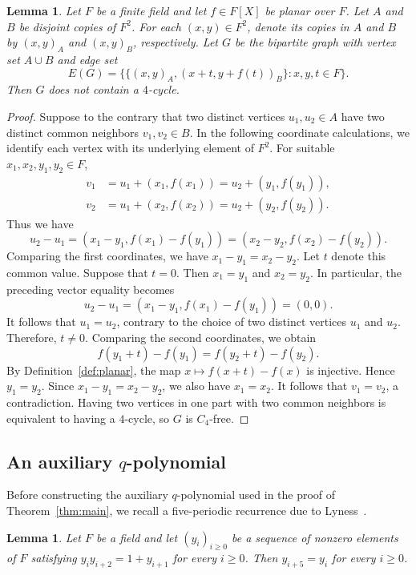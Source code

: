 \documentclass[12pt]{article}
\numberwithin{equation}{section}
\newtheorem{lemma}[theorem]{Lemma}
\theoremstyle{definition}
\begin{document}
\begin{lemma}\label{lem:planar-graph}
Let $F$ be a finite field and let $f\in F[X]$ be planar over $F$. Let $A$ and $B$ be disjoint copies of $F^2$. For each $(x,y)\in F^2$, denote its copies in $A$ and $B$ by $(x,y)_A$ and $(x,y)_B$, respectively. Let $G$ be the bipartite graph with vertex set $A\cup B$ and edge set
\[
        E(G)=\bigl\{\{(x,y)_A,(x+t,y+f(t))_B\}:x,y,t\in F\bigr\}.
\]
Then $G$ does not contain a $4$-cycle.
\end{lemma}

\begin{proof}
Suppose to the contrary that two distinct vertices $u_1,u_2\in A$ have two distinct common neighbors $v_1,v_2\in B$. In the following coordinate calculations, we identify each vertex with its underlying element of $F^2$. For suitable $x_1,x_2,y_1,y_2\in F$,
\begin{align*}
v_1&=u_1+(x_1,f(x_1))=u_2+(y_1,f(y_1)),\\
v_2&=u_1+(x_2,f(x_2))=u_2+(y_2,f(y_2)).
\end{align*}
Thus we have
\[
 u_2-u_1
 =(x_1-y_1,f(x_1)-f(y_1))
 =(x_2-y_2,f(x_2)-f(y_2)).
\]
Comparing the first coordinates, we have
$x_1-y_1=x_2-y_2$. Let $t$ denote this common value.
Suppose that $t=0$. Then $x_1=y_1$ and $x_2=y_2$. In particular, the preceding vector equality becomes
\[
 u_2-u_1=(x_1-y_1,f(x_1)-f(y_1))=(0,0).
\]
It follows that $u_1=u_2$, contrary to the choice of two distinct vertices $u_1$ and $u_2$. Therefore, $t\ne0$.
Comparing the second coordinates, we obtain
\[
f(y_1+t)-f(y_1)=f(y_2+t)-f(y_2).
\]
By Definition~\ref{def:planar}, the map
$x\mapsto f(x+t)-f(x)$ is injective. Hence $y_1=y_2$. Since $x_1-y_1=x_2-y_2$, we also have $x_1=x_2$. It follows that $v_1=v_2$, a contradiction. Having two vertices in one part with two common neighbors is equivalent to having a $4$-cycle, so $G$ is $C_4$-free.
\end{proof}

\subsection{An auxiliary \texorpdfstring{$q$}{q}-polynomial}

Before constructing the auxiliary $q$-polynomial used in the proof of Theorem~\ref{thm:main}, we recall a five-periodic recurrence due to Lyness~\cite{Lyness1942}.

\begin{lemma}\label{lem:lyness}
Let $F$ be a field and let $(y_i)_{i\ge0}$ be a sequence of nonzero elements of $F$ satisfying $y_i y_{i+2}=1+y_{i+1}$ for every $i\ge0$. Then $y_{i+5}=y_i$ for every $i\ge0$.
\end{lemma}
\end{document}
